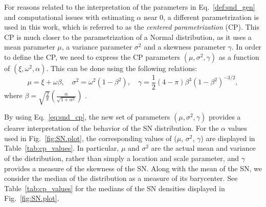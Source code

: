 \documentclass{aa}
\begin{document}
%
For reasons related to the interpretation of the parameters in Eq.~\eqref{def:snd_gen} and computational issues with estimating $\alpha$ near 0, a different parametrization is used in this work, which is referred to as the \textit{centered parametrization} (CP).  This CP is much closer to the parametrization of a Normal distribution, as it uses a mean parameter $\mu$, a variance parameter $\sigma^2$ and a skewness parameter $\gamma$. In order to define the CP, we need to express the CP parameters $(\mu, \sigma^2, \gamma)$ as a function of $(\xi, \omega^2, \alpha)$. This can be done using the following relations:
%
\begin{equation} \label{eq:snd_cp}
\mu = \xi + \omega \beta, \quad \sigma^{2} = \omega^{2}(1-\beta^2), \quad \gamma = \frac{1}{2}(4-\pi) \beta^{3}\left(1-\beta^2\right)^{-3/2},
\end{equation}
%
where $\beta = \sqrt{\frac{2}{\pi}}\left(\frac{\alpha}{\sqrt{1+\alpha^2}}\right)$ \citep[e.g.][]{Arellano-2010}.

By using Eq.~\eqref{eq:snd_cp}, the new set of parameters $(\mu, \sigma^2, \gamma)$ provides a clearer interpretation of the behavior of the SN distribution. For the $\alpha$ values used in Fig.~\ref{fig:SN.plot}, the corresponding values of ($\mu$, $\sigma^2$, $\gamma$) are displayed in Table~\ref{tab:cp_values}.  In particular, $\mu$ and $\sigma^2$ are the actual mean and variance of the distribution, rather than simply a location and scale parameter, and $\gamma$ provides a measure of the skewness of the SN. 
Along with the mean of the SN, we consider the median of the distribution as a measure of its barycenter.  See Table~\ref{tab:cp_values} for the medians of the SN densities displayed in Fig.~\ref{fig:SN.plot}.

%
\end{document}
